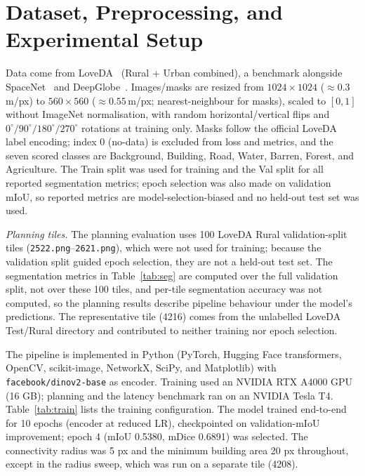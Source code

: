 \documentclass[runningheads]{llncs}
\begin{document}
\section{Dataset, Preprocessing, and Experimental Setup}\label{sec:setup}
Data come from LoveDA~\cite{wang2021loveda} (Rural + Urban combined), a benchmark alongside SpaceNet~\cite{vanetten2018} and DeepGlobe~\cite{demir2018}. Images/masks are resized from $1024\times1024$ ($\approx0.3$\,m/px) to $560\times560$ ($\approx0.55$\,m/px; nearest-neighbour for masks), scaled to $[0,1]$ without ImageNet normalisation, with random horizontal/vertical flips and $0^\circ/90^\circ/180^\circ/270^\circ$ rotations at training only. Masks follow the official LoveDA label encoding; index 0 (no-data) is excluded from loss and metrics, and the seven scored classes are Background, Building, Road, Water, Barren, Forest, and Agriculture. The Train split was used for training and the Val split for all reported segmentation metrics; epoch selection was also made on validation mIoU, so reported metrics are model-selection-biased and no held-out test set was used.

\emph{Planning tiles.} The planning evaluation uses 100 LoveDA Rural validation-split tiles (\texttt{2522.png}--\texttt{2621.png}), which were not used for training; because the validation split guided epoch selection, they are not a held-out test set. The segmentation metrics in Table~\ref{tab:seg} are computed over the full validation split, not over these 100 tiles, and per-tile segmentation accuracy was not computed, so the planning results describe pipeline behaviour under the model's predictions. The representative tile (4216) comes from the unlabelled LoveDA Test/Rural directory and contributed to neither training nor epoch selection.

The pipeline is implemented in Python (PyTorch, Hugging Face transformers, OpenCV, scikit-image, NetworkX, SciPy, and Matplotlib) with \texttt{facebook/dinov2-base} as encoder. Training used an NVIDIA RTX A4000 GPU (16 GB); planning and the latency benchmark ran on an NVIDIA Tesla T4. Table~\ref{tab:train} lists the training configuration. The model trained end-to-end for 10 epochs (encoder at reduced LR), checkpointed on validation-mIoU improvement; epoch 4 (mIoU 0.5380, mDice 0.6891) was selected. The connectivity radius was 5 px and the minimum building area 20 px throughout, except in the radius sweep, which was run on a separate tile (4208).
\end{document}
